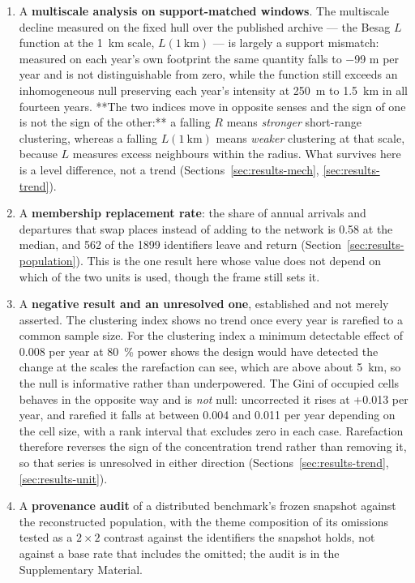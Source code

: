 \documentclass{article}
\newcommand{\replMedian}{0.58}
\newcommand{\rRareMDE}{0.008}
\newcommand{\gfGiniSlope}{+0.013}
\begin{document}
\begin{enumerate}
(Section~\ref{sec:results-origin}).
\item A \textbf{multiscale analysis on support-matched windows}. The multiscale decline measured
on the fixed hull over the published archive --- the Besag $L$ function \cite{besag1977simple} at the
\SI{1}{\kilo\meter} scale, $L(\SI{1}{\kilo\meter})$ --- is largely a support mismatch: measured on
each year's own footprint the same quantity falls to
\num{-99} m per year and is not distinguishable from zero, while the function still exceeds an
inhomogeneous null preserving each year's intensity at \SI{250}{\meter} to
\SI{1.5}{\kilo\meter} in all fourteen years. **The two indices move in opposite senses and the
sign of one is not the sign of the other:** a falling $R$ means \emph{stronger} short-range
clustering, whereas a falling $L(\SI{1}{\kilo\meter})$ means \emph{weaker} clustering at that
scale, because $L$ measures excess neighbours within the radius. What survives here is a level
difference, not a trend
(Sections~\ref{sec:results-mech}, \ref{sec:results-trend}).
\item A \textbf{membership replacement rate}: the share of annual arrivals and departures that
swap places instead of adding to the network is \replMedian{} at the median, and
\num{562} of the \num{1899} identifiers leave and return
(Section~\ref{sec:results-population}). This is the one result here whose value does not depend
on which of the two units is used, though the frame still sets it.
\item A \textbf{negative result and an unresolved one}, established and not merely asserted.
The clustering index shows no trend once every year is rarefied to a common
sample size. For the clustering index a minimum detectable effect of \rRareMDE{} per year at
\SI{80}{\percent} power shows the design would have detected the change at the scales the
rarefaction can see, which are above about \SI{5}{\kilo\meter}, so the null is informative rather
than underpowered. The Gini of occupied cells behaves in the opposite way and is \emph{not}
null: uncorrected it rises at \gfGiniSlope{} per year, and rarefied it falls at between
\num{0.004} and \num{0.011} per year depending on the cell size, with a rank interval that
excludes zero in each case. Rarefaction therefore reverses the sign of the concentration trend
rather than removing it, so that series is unresolved in either direction
(Sections~\ref{sec:results-trend}, \ref{sec:results-unit}).
\item A \textbf{provenance audit} of a distributed benchmark's frozen snapshot against the
reconstructed population, with the theme composition of its omissions tested as a $2\times2$
contrast against the identifiers the snapshot holds, not against a base rate that includes the
omitted; the audit is in the Supplementary Material.
\end{enumerate}
\end{document}
